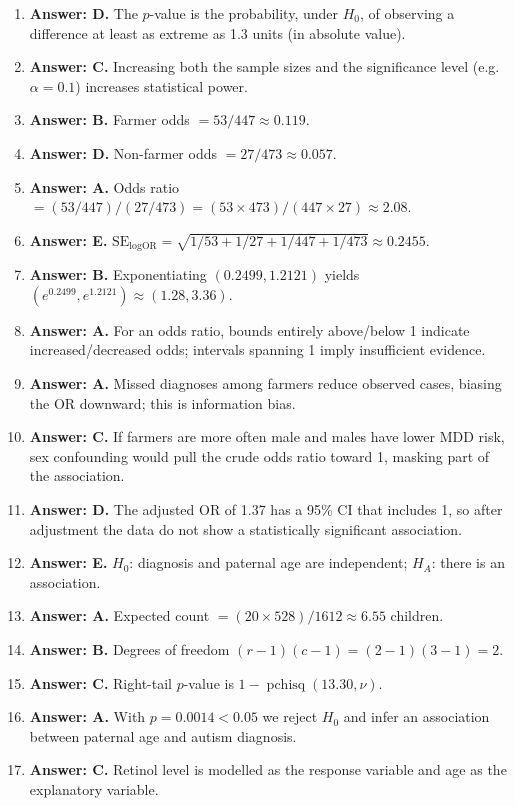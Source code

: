 \documentclass[11pt]{article}
\begin{document}
\begin{enumerate}[label=\textbf{Q\arabic*:}, leftmargin=*, itemsep=0.9em]
\item \textbf{Answer: D.} The $p$-value is the probability, under $H_0$, of observing a difference at least as extreme as 1.3 units (in absolute value).
\item \textbf{Answer: C.} Increasing both the sample sizes and the significance level (e.g. $\alpha=0.1$) increases statistical power.
\item \textbf{Answer: B.} Farmer odds $= 53/447 \approx 0.119$.
\item \textbf{Answer: D.} Non-farmer odds $= 27/473 \approx 0.057$.
\item \textbf{Answer: A.} Odds ratio $= (53/447)/(27/473) = (53\times 473)/(447\times 27) \approx 2.08$.
\item \textbf{Answer: E.} $\text{SE}_{\log \text{OR}} = \sqrt{1/53 + 1/27 + 1/447 + 1/473} \approx 0.2455$.
\item \textbf{Answer: B.} Exponentiating $(0.2499, 1.2121)$ yields $(e^{0.2499}, e^{1.2121}) \approx (1.28, 3.36)$.
\item \textbf{Answer: A.} For an odds ratio, bounds entirely above/below 1 indicate increased/decreased odds; intervals spanning 1 imply insufficient evidence.
\item \textbf{Answer: A.} Missed diagnoses among farmers reduce observed cases, biasing the OR downward; this is information bias.
\item \textbf{Answer: C.} If farmers are more often male and males have lower MDD risk, sex confounding would pull the crude odds ratio toward 1, masking part of the association.
\item \textbf{Answer: D.} The adjusted OR of 1.37 has a 95\% CI that includes 1, so after adjustment the data do not show a statistically significant association.
\item \textbf{Answer: E.} $H_0$: diagnosis and paternal age are independent; $H_A$: there is an association.
\item \textbf{Answer: A.} Expected count $= (20\times 528)/1612 \approx 6.55$ children.
\item \textbf{Answer: B.} Degrees of freedom $(r-1)(c-1) = (2-1)(3-1) = 2$.
\item \textbf{Answer: C.} Right-tail $p$-value is $1 - \operatorname{pchisq}(13.30,\nu)$.
\item \textbf{Answer: A.} With $p=0.0014 < 0.05$ we reject $H_0$ and infer an association between paternal age and autism diagnosis.
\item \textbf{Answer: C.} Retinol level is modelled as the response variable and age as the explanatory variable.

\end{enumerate}
\end{document}
